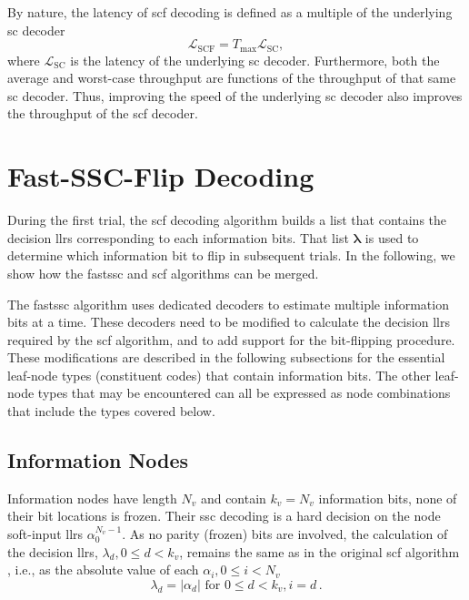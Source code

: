 \documentclass[conference]{IEEEtran}
\newcommand{\mvec}[1]{\bm{#1}}
\begin{document}
By nature, the latency of \gls{scf} decoding is defined as a multiple of the underlying \gls{sc} decoder
\begin{equation}\label{eqn:latency:scf}
  \mathcal{L}_{\text{SCF}} = T_{\max}\mathcal{L}_{\text{SC}},
\end{equation}
where $\mathcal{L}_{\text{SC}}$ is the latency of the underlying \gls{sc} decoder. Furthermore, both the average and worst-case throughput are functions of the throughput of that same \gls{sc} decoder. Thus, improving the speed of the underlying \gls{sc} decoder also improves the throughput of the \gls{scf} decoder.

\section{Fast-SSC-Flip Decoding}\label{sec:algo}

During the first trial, the \gls{scf} decoding algorithm builds a list that contains the decision \glspl{llr} corresponding to each information bits. That list $\mvec{\lambda}$ is used to determine which information bit to flip in subsequent trials. In the following, we show how the \gls{fastssc} and \gls{scf} algorithms can be merged. 

The \gls{fastssc} algorithm uses dedicated decoders to estimate multiple information bits at a time. These decoders need to be modified to calculate the decision \glspl{llr} required by the \gls{scf} algorithm, and to add support for the bit-flipping procedure. These modifications are described in the following subsections for the essential leaf-node types (constituent codes) that contain information bits. The other leaf-node types that may be encountered can all be expressed as node combinations that include the types covered below.

\subsection{Information Nodes}
Information nodes have length $N_v$ and contain $k_v=N_v$ information bits,  none of their bit locations is frozen. Their \gls{ssc} decoding is a hard decision on the node soft-input \glspl{llr} $\alpha_0^{N_v-1}$. As no parity (frozen) bits are involved, the calculation of the decision \glspl{llr}, $\lambda_d, 0 \leq d < k_v$, remains the same as in the original \gls{scf} algorithm \cite{Afisiadis2014}, i.e., as the absolute value of each $\alpha_i, 0 \leq i < N_v$
\begin{equation}
  \lambda_d=\left|\alpha_d\right| \text{ for } 0 \leq d < k_v, i=d\,.
\end{equation}
\end{document}
